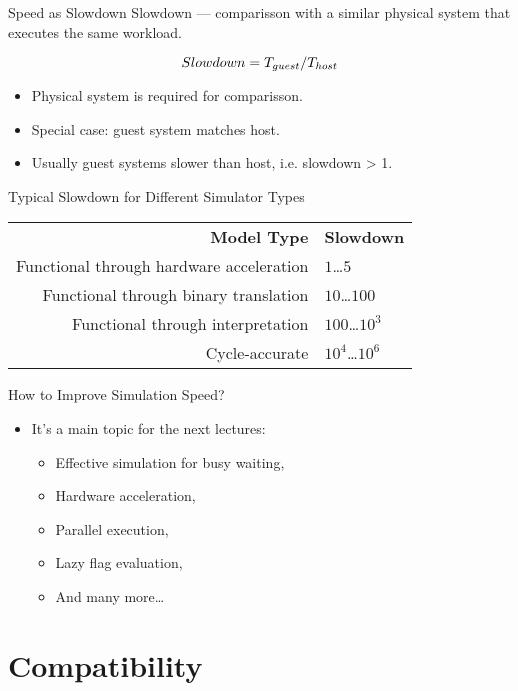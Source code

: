 \begin{frame}{Speed as Slowdown}
Slowdown --- comparisson with a similar physical system that executes the same
workload.

\begin{equation*}
\centering
Slowdown = T_{guest}/T_{host}
\end{equation*}

\vfill

\begin{itemize}
\item Physical system is required for comparisson.
\item Special case: guest system matches host.
\item Usually guest systems slower than host, i.e. slowdown > 1.
\end{itemize}
\end{frame}

\begin{frame}{Typical Slowdown for Different Simulator Types}
\begin{tabular}{rl}
\textbf{Model Type}                      & \textbf{Slowdown} \\
Functional through hardware acceleration & $1$\dots$5$ \\
Functional through binary translation    & $10$\dots$100$ \\
Functional through interpretation        & $100$\dots$10^3$ \\
Cycle-accurate                           & $10^4$\dots$10^6$ \\
\end{tabular}
\end{frame}

\begin{frame}{How to Improve Simulation Speed?}
\begin{itemize}
\item It's a main topic for the next lectures:
\begin{itemize}
\item Effective simulation for busy waiting,
\item Hardware acceleration,
\item Parallel execution,
\item Lazy flag evaluation,
\item And many more\dots
\end{itemize}
\end{itemize}
\end{frame}

\section{Compatibility}

